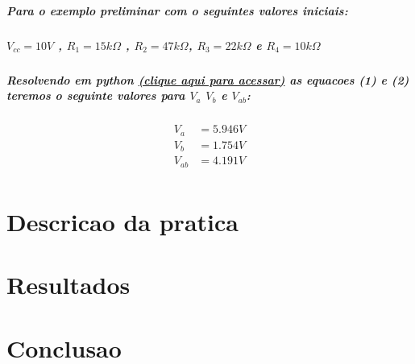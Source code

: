 \documentclass[12pt,twoside, a4paper, twocolumn]{article}
\begin{document}
\subparagraph*{Para o exemplo preliminar com o seguintes valores iniciais: }
\subparagraph*{$V_{cc} = 10V$ , $R_1 = 15k\varOmega$ , $R_2 = 47k\varOmega$, $R_3 = 22k\varOmega$ e $R_4 = 10k\varOmega$}

\subparagraph*{Resolvendo em python \href{https://www.online-python.com/AkfwEsRGU9}{(clique aqui para acessar)} as equacoes (1) e (2) teremos o seguinte valores para $V_{a}$  $V_b$ e $V_{ab}$:}

\begin{equation*}
    \begin{aligned}
        V_{a}  & = 5.946V \\
        V_{b}  & = 1.754V \\
        V_{ab} & = 4.191V \\
    \end{aligned}
\end{equation*}


\section{Descricao da pratica}

\section{Resultados}

\section{Conclusao}
\end{document}
